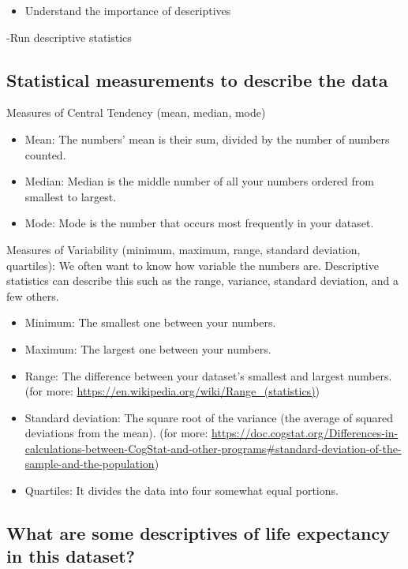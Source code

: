 \documentclass[
]{book}
\providecommand{\tightlist}{%
  \setlength{\itemsep}{0pt}\setlength{\parskip}{0pt}}
\begin{document}
\begin{itemize}
\tightlist
\item
  Understand the importance of descriptives
\end{itemize}

-Run descriptive statistics

\hypertarget{statistical-measurements-to-describe-the-data}{%
\subsection{Statistical measurements to describe the data}\label{statistical-measurements-to-describe-the-data}}

Measures of Central Tendency (mean, median, mode)

\begin{itemize}
\item
  Mean: The numbers' mean is their sum, divided by the number of numbers counted.
\item
  Median: Median is the middle number of all your numbers ordered from smallest to largest.
\item
  Mode: Mode is the number that occurs most frequently in your dataset.
\end{itemize}

Measures of Variability (minimum, maximum, range, standard deviation, quartiles): We often want to know how variable the numbers are. Descriptive statistics can describe this such as the range, variance, standard deviation, and a few others.

\begin{itemize}
\item
  Minimum: The smallest one between your numbers.
\item
  Maximum: The largest one between your numbers.
\item
  Range: The difference between your dataset's smallest and largest numbers. (for more: \url{https://en.wikipedia.org/wiki/Range_(statistics)})
\item
  Standard deviation: The square root of the variance (the average of squared deviations from the mean). (for more: \url{https://doc.cogstat.org/Differences-in-calculations-between-CogStat-and-other-programs\#standard-deviation-of-the-sample-and-the-population})
\item
  Quartiles: It divides the data into four somewhat equal portions.
\end{itemize}

\hypertarget{what-are-some-descriptives-of-life-expectancy-in-this-dataset}{%
\subsection{What are some descriptives of life expectancy in this dataset?}\label{what-are-some-descriptives-of-life-expectancy-in-this-dataset}}
\end{document}
